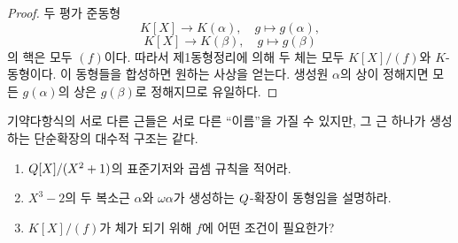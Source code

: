 \begin{proof}
두 평가 준동형
\[
  K[X]\to K(\alpha),\quad g\mapsto g(\alpha),
\]
\[
  K[X]\to K(\beta),\quad g\mapsto g(\beta)
\]
의 핵은 모두 $(f)$이다. 따라서 제1동형정리에 의해 두 체는 모두 $K[X]/(f)$와 $K$-동형이다. 이 동형들을 합성하면 원하는 사상을 얻는다. 생성원 $\alpha$의 상이 정해지면 모든 $g(\alpha)$의 상은 $g(\beta)$로 정해지므로 유일하다.
\end{proof}

\begin{keyidea}
기약다항식의 서로 다른 근들은 서로 다른 ``이름''을 가질 수 있지만, 그 근 하나가 생성하는 단순확장의 대수적 구조는 같다.
\end{keyidea}

\begin{checkpoint}
\begin{enumerate}[label=(\alph*)]
  \item $Q[X]/(X^2+1)$의 표준기저와 곱셈 규칙을 적어라.
  \item $X^3-2$의 두 복소근 $\alpha$와 $\omega\alpha$가 생성하는 $Q$-확장이 동형임을 설명하라.
  \item $K[X]/(f)$가 체가 되기 위해 $f$에 어떤 조건이 필요한가?
\end{enumerate}
\end{checkpoint}
